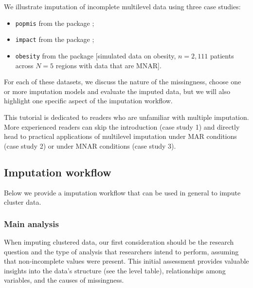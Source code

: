 \documentclass[
]{jss}
\providecommand{\tightlist}{%
  \setlength{\itemsep}{0pt}\setlength{\parskip}{0pt}}
\begin{document}
We illustrate imputation of incomplete multilevel data using three case
studies:

\begin{itemize}
\tightlist
\item
  \texttt{popmis} from the  package \citep[simulated data on
  perceived popularity, \(n = 2,000\) pupils across \(N = 100\) schools
  with data that are MAR,][]{mice};
\item
  \texttt{impact} from the  package \citep[empirical data
  on traumatic brain injuries, \(n = 11,022\) patients across \(N = 15\)
  studies with data that are MAR,][]{metamisc};
\item
  \texttt{obesity} from the  package {[}simulated data on
  obesity, \(n = 2,111\) patients across \(N = 5\) regions with data
  that are MNAR{]}.
\end{itemize}

For each of these datasets, we discuss the nature of the missingness,
choose one or more imputation models and evaluate the imputed data, but
we will also highlight one specific aspect of the imputation workflow.

This tutorial is dedicated to readers who are unfamiliar with multiple
imputation. More experienced readers can skip the introduction (case
study 1) and directly head to practical applications of multilevel
imputation under MAR conditions (case study 2) or under MNAR conditions
(case study 3).

\hypertarget{imputation-workflow}{%
\subsection{Imputation workflow}\label{imputation-workflow}}

Below we provide a imputation workflow that can be used in general to
impute cluster data.

\hypertarget{main-analysis}{%
\subsubsection{Main analysis}\label{main-analysis}}

When imputing clustered data, our first consideration should be the
research question and the type of analysis that researchers intend to
perform, assuming that non-incomplete values were present. This initial
assessment provides valuable insights into the data's structure (see the
level table), relationships among variables, and the causes of
missingness.
\end{document}
